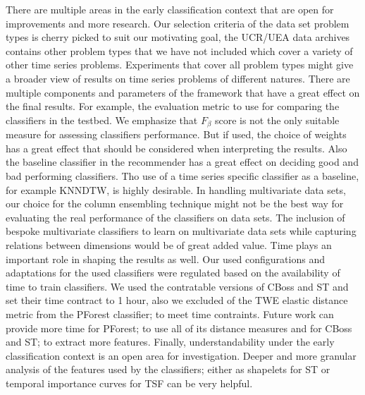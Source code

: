 There are multiple areas in the early classification context that are open for improvements and more research.
Our selection criteria of the data set problem types is cherry picked to suit our motivating goal, the UCR/UEA data archives contains other problem types that we have not included which cover a variety of other time series problems.
Experiments that cover all problem types might give a broader view of results on time series problems of different natures.
There are multiple components and parameters of the framework that have a great effect on the final results.
For example, the evaluation metric to use for comparing the classifiers in the testbed.
We emphasize that $F_{\beta}$ score is not the only suitable measure for assessing classifiers performance.
But if used, the choice of weights has a great effect that should be considered when interpreting the results.
Also the baseline classifier in the recommender has a great effect on deciding good and bad performing classifiers.
Tho use of a time series specific classifier as a baseline, for example KNNDTW, is highly desirable.
In handling multivariate data sets, our choice for the column ensembling technique might not be the best way for evaluating the real performance of the classifiers on data sets.
The inclusion of bespoke multivariate classifiers to learn on multivariate data sets while capturing relations between dimensions would be of great added value.
Time plays an important role in shaping the results as well.
Our used configurations and adaptations for the used classifiers were regulated based on the availability of time to train classifiers.
We used the contratable versions of CBoss and ST and set their time contract to 1 hour, also we excluded of the TWE elastic distance metric from the PForest classifier; to meet time contraints.
Future work can provide more time for PForest; to use all of its distance measures and for CBoss and ST; to extract more features.
Finally, understandability under the early classification context is an open area for investigation.
Deeper and more granular analysis of the features used by the classifiers; either as shapelets for ST or temporal importance curves for TSF can be very helpful.
